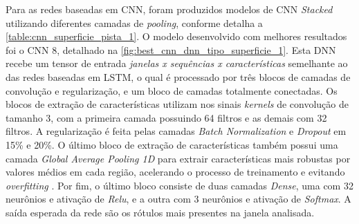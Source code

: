 Para as redes baseadas em CNN, foram produzidos modelos de CNN \textit{Stacked} utilizando diferentes camadas de \textit{pooling}, conforme detalha a \autoref{table:cnn_superficie_pista_1}. O modelo desenvolvido com melhores resultados foi o CNN 8, detalhado na \autoref{fig:best_cnn_dnn_tipo_superficie_1}. Esta DNN recebe um tensor de entrada \emph{janelas x sequências x características} semelhante ao das redes baseadas em LSTM, o qual é processado por três blocos de camadas de convolução e regularização, e um bloco de camadas totalmente conectadas. Os blocos de extração de características utilizam nos sinais \textit{kernels} de convolução de tamanho 3, com a primeira camada possuindo 64 filtros e as demais com 32 filtros. A regularização é feita pelas camadas \textit{Batch Normalization} e \textit{Dropout} em 15\% e 20\%. O último bloco de extração de características também possui uma camada \textit{Global Average Pooling 1D} para extrair características mais robustas por valores médios em cada região, acelerando o processo de treinamento e evitando \textit{overfitting} \cite{Yang2018, Wang2019}. Por fim, o último bloco consiste de duas camadas \textit{Dense}, uma com 32 neurônios e ativação de \textit{Relu}, e a outra com 3 neurônios e ativação de \textit{Softmax}. A saída esperada da rede são os rótulos mais presentes na janela analisada.

